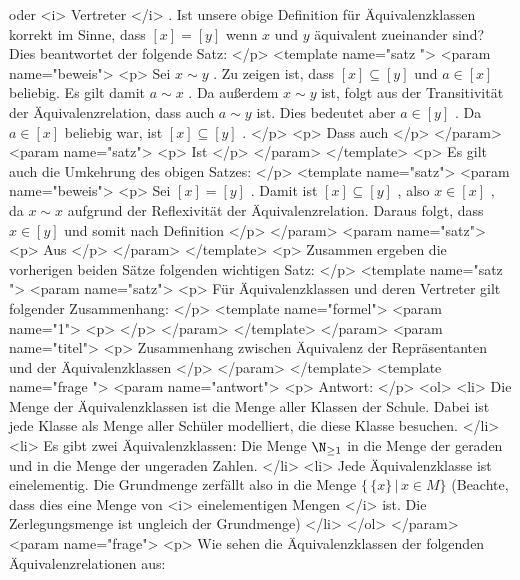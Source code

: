    oder
   <i>
    Vertreter
   </i>
   . Ist unsere obige Definition für Äquivalenzklassen korrekt im Sinne, dass
   $[x]=[y]$
   wenn
   $x$
   und
   $y$
   äquivalent zueinander sind? Dies beantwortet der folgende Satz:
  </p>
  <template name="satz
 ">
   <param name="beweis">
    <p>
     Sei
     $x\sim y$
     . Zu zeigen ist, dass
     $[x]\subseteq [y]$
     und
     $a\in [x]$
     beliebig. Es gilt damit
     $a\sim x$
     . Da außerdem
     $x\sim y$
     ist, folgt aus der Transitivität der Äquivalenzrelation, dass auch
     $a\sim y$
     ist. Dies bedeutet aber
     $a\in [y]$
     . Da
     $a\in [x]$
     beliebig war, ist
     $[x]\subseteq[y]$
     .
    </p>
    <p>
     Dass auch
    </p>
   </param>
   <param name="satz">
    <p>
     Ist
    </p>
   </param>
  </template>
  <p>
   Es gilt auch die Umkehrung des obigen Satzes:
  </p>
  <template name="satz">
   <param name="beweis">
    <p>
     Sei
     $[x]=[y]$
     . Damit ist
     $[x]\subseteq [y]$
     , also
     $x\in[x]$
     , da
     $x\sim x$
     aufgrund der Reflexivität der Äquivalenzrelation. Daraus folgt, dass
     $x\in [y]$
     und somit nach Definition
    </p>
   </param>
   <param name="satz">
    <p>
     Aus
    </p>
   </param>
  </template>
  <p>
   Zusammen ergeben die vorherigen beiden Sätze folgenden wichtigen Satz:
  </p>
  <template name="satz
 ">
   <param name="satz">
    <p>
     Für Äquivalenzklassen und deren Vertreter gilt folgender Zusammenhang:
    </p>
    <template name="formel">
     <param name="1">
      <p>
      </p>
     </param>
    </template>
   </param>
   <param name="titel">
    <p>
     Zusammenhang zwischen Äquivalenz der Repräsentanten und der Äquivalenzklassen
    </p>
   </param>
  </template>
  <template name="frage
 ">
   <param name="antwort">
    <p>
     Antwort:
    </p>
    <ol>
     <li>
      Die Menge der Äquivalenzklassen ist die Menge aller Klassen der Schule. Dabei ist jede Klasse als Menge aller Schüler modelliert, die diese Klasse besuchen.
     </li>
     <li>
      Es gibt zwei Äquivalenzklassen: Die Menge
      $\N_{\ge1}$
      in die Menge der geraden und in die Menge der ungeraden Zahlen.
     </li>
     <li>
      Jede Äquivalenzklasse ist einelementig. Die Grundmenge zerfällt also in die Menge
      $\{\,\{x\}\,|\,x\in M\}$
      (Beachte, dass dies eine Menge von
      <i>
       einelementigen Mengen
      </i>
      ist. Die Zerlegungsmenge ist ungleich der Grundmenge)
     </li>
    </ol>
   </param>
   <param name="frage">
    <p>
     Wie sehen die Äquivalenzklassen der folgenden Äquivalenzrelationen aus:
